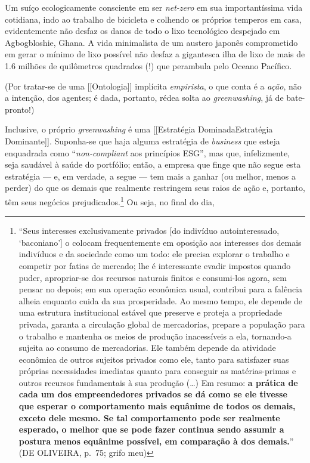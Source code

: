 Um suíço ecologicamente consciente em ser \emph{net-zero} em sua
importantíssima vida cotidiana, indo ao trabalho de bicicleta e colhendo
os próprios temperos em casa, evidentemente não desfaz os danos de todo
o lixo tecnológico despejado em Agbogbloshie, Ghana. A vida minimalista
de um austero japonês comprometido em gerar o mínimo de lixo possível
não desfaz a gigantesca ilha de lixo de mais de 1.6 milhões de
quilômetros quadrados (!) que perambula pelo Oceano Pacífico.

(Por tratar-se de uma {[}{[}Ontologia{]}{]} implícita \emph{empirista},
o que conta é a \emph{ação}, não a intenção, dos agentes; é dada,
portanto, rédea solta ao \emph{greenwashing}, já de bate-pronto!)

Inclusive, o próprio \emph{greenwashing} é uma {[}{[}Estratégia
Dominada\textbar Estratégia Dominante{]}{]}. Suponha-se que haja alguma
estratégia de \emph{business} que esteja enquadrada como
``\emph{non-compliant} aos princípios ESG'', mas que, infelizmente, seja
saudável à saúde do portfólio; então, a empresa que finge que não segue
esta estratégia --- e, em verdade, a segue --- tem mais a ganhar (ou
melhor, menos a perder) do que os demais que realmente restringem seus
raios de ação e, portanto, têm seus negócios prejudicados.\footnote{``Seus
  interesses exclusivamente privados {[}do indivíduo autointeressado,
  `baconiano'{]} o colocam frequentemente em oposição aos interesses dos
  demais indivíduos e da sociedade como um todo: ele precisa explorar o
  trabalho e competir por fatias de mercado; lhe é interessante evadir
  impostos quando puder, apropriar-se dos recursos naturais finitos e
  consumi-los agora, sem pensar no depois; em sua operação econômica
  usual, contribui para a falência alheia enquanto cuida da sua
  prosperidade. Ao mesmo tempo, ele depende de uma estrutura
  institucional estável que preserve e proteja a propriedade privada,
  garanta a circulação global de mercadorias, prepare a população para o
  trabalho e mantenha os meios de produção inacessíveis a ela,
  tornando-a sujeita ao consumo de mercadorias. Ele também depende da
  atividade econômica de outros sujeitos privados como ele, tanto para
  satisfazer suas próprias necessidades imediatas quanto para conseguir
  as matérias-primas e outros recursos fundamentais à sua produção
  (\ldots) Em resumo: \textbf{a prática de cada um dos empreendedores
  privados se dá como se ele tivesse que esperar o comportamento mais
  equânime de todos os demais, exceto dele mesmo. Se tal comportamento
  pode ser realmente esperado, o melhor que se pode fazer continua sendo
  assumir a postura menos equânime possível, em comparação à dos
  demais.}'' (DE OLIVEIRA, p.~75; grifo meu)} Ou seja, no final do dia,
